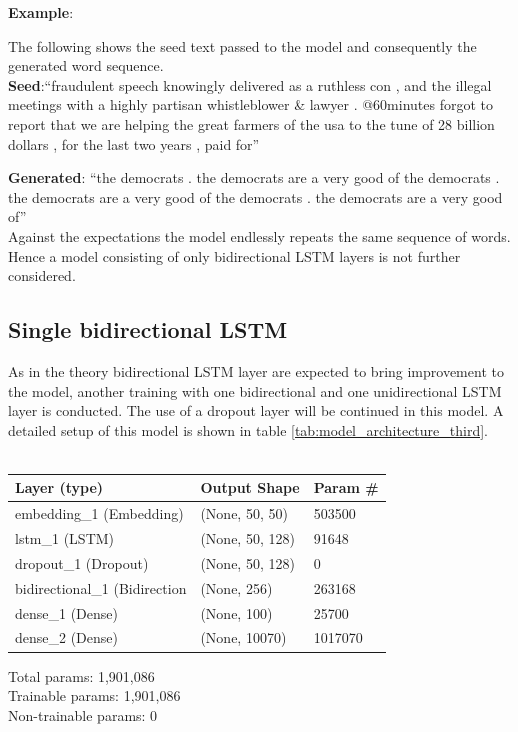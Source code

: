 \documentclass[conference]{IEEEtran}
\begin{document}
\textbf{Example}:

The following shows the seed text passed to the model and consequently the generated word sequence.\\

\textbf{Seed}:``fraudulent speech knowingly delivered as a ruthless con , and the illegal meetings with a highly partisan whistleblower \& lawyer . @60minutes forgot to report that we are helping the great farmers of the usa to the tune of 28 billion dollars , for the last two years , paid for''

\textbf{Generated}: ``the democrats . the democrats are a very good of the democrats . the democrats are a very good of the democrats . the democrats are a very good of''\\

Against the expectations the model endlessly repeats the same sequence of words. Hence a model consisting of only bidirectional LSTM layers is not further considered.

\subsection{Single bidirectional LSTM}

As in the theory bidirectional LSTM layer are expected to bring improvement to the model, another training with one bidirectional and one unidirectional LSTM layer is conducted. The use of a dropout layer will be continued in this model. A detailed setup of this model is shown in table \ref{tab:model_architecture_third}.\\
\\

\begin{center}
\begin{tabular}{l l l}
\hline
Layer (type) & Output Shape & Param \#\\
\hline
\hline
embedding\_1 (Embedding) & (None, 50, 50) & 503500\\
\hline
lstm\_1 (LSTM) & (None, 50, 128) & 91648\\
\hline
dropout\_1 (Dropout) & (None, 50, 128) & 0\\
\hline
bidirectional\_1 (Bidirection & (None, 256) & 263168\\
\hline
dense\_1 (Dense) & (None, 100) & 25700\\
\hline
dense\_2 (Dense) & (None, 10070) & 1017070\\
\hline
\hline
\end{tabular}
\begin{flushleft}
Total params: 1,901,086\\
Trainable params: 1,901,086\\
Non-trainable params: 0
\end{flushleft}
\end{center}
\end{document}
